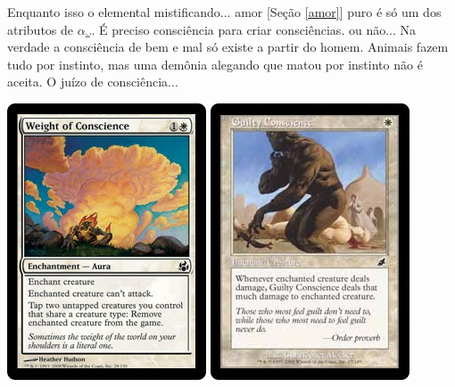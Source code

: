 \documentclass[12pt,a4paper]{article}
\begin{document}
		Enquanto isso o elemental mistificando... amor [Se\c{c}\~ao \ref{amor}] puro \'e s\'o um dos atributos de $ \alpha_\omega $. \'E preciso consci\^encia para criar consci\^encias. ou n\~ao... Na verdade a consci\^encia de bem e mal s\'o existe a partir do homem. Animais fazem tudo por instinto, mas uma dem\^onia\cite{x} alegando que matou por instinto n\~ao \'e aceita. O ju\'izo de consci\^encia...

		\begin{center}
			\includegraphics{conscience} \includegraphics{guilty}


\end{center}
\end{document}
